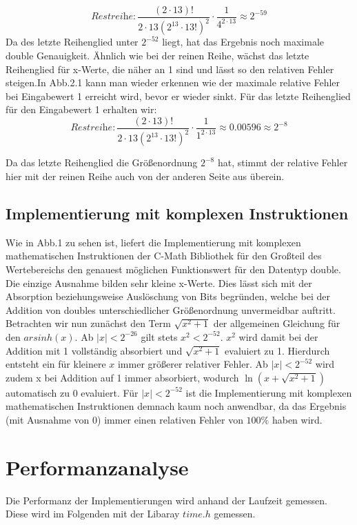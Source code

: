 \documentclass[course=erap] {aspdoc}
\begin{document}
    \[
    \textit{Restreihe}: \frac{(2\cdot13)!}{2\cdot13(2^{13}\cdot 13!)^2} \cdot \frac{1}{4^{2\cdot13}} \approx 2^{-59}
    \]
    Da des letzte Reihenglied unter $2^{-52}$ liegt, hat das Ergebnis noch maximale double Genauigkeit. Ähnlich wie bei der reinen Reihe, wächst das letzte Reihenglied für x-Werte, die näher an 1 sind und lässt so den relativen Fehler steigen.In Abb.2.1 kann man wieder erkennen wie der maximale relative Fehler bei Eingabewert 1 erreicht wird, bevor er wieder sinkt.
    Für das letzte Reihenglied für den Eingabewert 1 erhalten wir:
    \[
    \textit{Restreihe}: \frac{(2\cdot13)!}{2\cdot13(2^{13}\cdot 13!)^2} \cdot \frac{1}{1^{2\cdot13}} \approx 0.00596 \approx 2^{-8}
    \]
    
    Da das letzte Reihenglied die Größenordnung $2^{-8}$ hat, stimmt der relative Fehler hier mit der reinen Reihe auch von der anderen Seite aus überein.
    
    
    
    \subsection{Implementierung mit komplexen Instruktionen}
    Wie in Abb.1 zu sehen ist, liefert die Implementierung mit komplexen mathematischen Instruktionen der C-Math Bibliothek für den Großteil des Wertebereichs den genauest möglichen Funktionswert für den Datentyp double. Die einzige Ausnahme bilden sehr kleine x-Werte. Dies lässt sich mit der Absorption beziehungsweise Auslöschung von Bits begründen, welche bei der Addition von doubles unterschiedlicher Größenordnung unvermeidbar auftritt. Betrachten wir nun zunächst den Term $\sqrt{x^2 + 1}$ der allgemeinen Gleichung für den $arsinh(x)$. Ab $|x|<2^{-26}$ gilt stets $x^2<2^{-52}$. $x^2$ wird damit bei der Addition mit 1 vollständig absorbiert und $\sqrt{x^2 + 1}$ evaluiert zu 1. Hierdurch entsteht ein für kleinere $x$ immer größerer relativer Fehler. Ab $|x|<2^{-52}$ wird zudem x bei Addition auf 1 immer absorbiert, wodurch $\ln{(x+\sqrt{x^2 + 1})}$ automatisch zu 0 evaluiert. Für $|x|<2^{-52}$ ist die Implementierung mit komplexen mathematischen Instruktionen demnach kaum noch anwendbar, da das Ergebnis (mit Ausnahme von 0) immer einen relativen Fehler von $100\%$ haben wird.

    \section{Performanzanalyse}
    Die Performanz der Implementierungen wird anhand der Laufzeit gemessen.
    Diese wird im Folgenden mit der Libaray $time.h$ gemessen.
\end{document}
